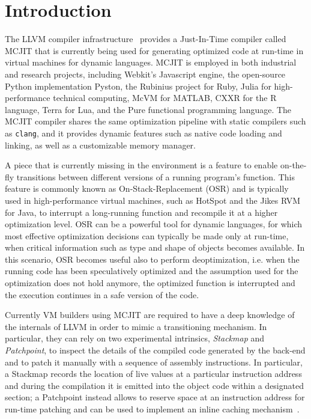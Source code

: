 \section{Introduction}
\label{se:intro}

The LLVM compiler infrastructure~\cite{lattner2004llvm} provides a Just-In-Time compiler called MCJIT that is currently being used for generating optimized code at run-time in virtual machines for dynamic languages. MCJIT is employed in both industrial and research projects, including Webkit's Javascript engine, the open-source Python implementation Pyston, the Rubinius project for Ruby, Julia for high-performance technical computing, McVM for MATLAB, CXXR for the R language, Terra for Lua, and the Pure functional programming language. The MCJIT compiler shares the same optimization pipeline with static compilers such as {\tt clang}, and it provides dynamic features such as native code loading and linking, as well as a customizable memory manager.

A piece that is currently missing in the environment is a feature to enable on-the-fly transitions between different versions of a running program's function. This feature is commonly known as On-Stack-Replacement (OSR) and is typically used in high-performance virtual machines, such as HotSpot and the Jikes RVM for Java, to interrupt a long-running function and recompile it at a higher optimization level. OSR can be a powerful tool for dynamic languages, for which most effective optimization decisions can typically be made only at run-time, when critical information such as type and shape of objects becomes available. In this scenario, OSR becomes useful also to perform deoptimization, i.e. when the running code has been speculatively optimized and the assumption used for the optimization does not hold anymore, the optimized function is interrupted and the execution continues in a safe version of the code.

Currently VM builders using MCJIT are required to have a deep knowledge of the internals of LLVM in order to mimic a transitioning mechanism. In particular, they can rely on two experimental intrinsics, {\em Stackmap} and {\em Patchpoint}, to inspect the details of the compiled code generated by the back-end and to patch it manually with a sequence of assembly instructions. In particular, a Stackmap records the location of live values at a particular instruction address and during the compilation it is emitted into the object code within a designated section; a Patchpoint instead allows to reserve space at an instruction address for run-time patching and can be used to implement an inline caching mechanism~\cite{deutsch1984inlinecaching}.
  
